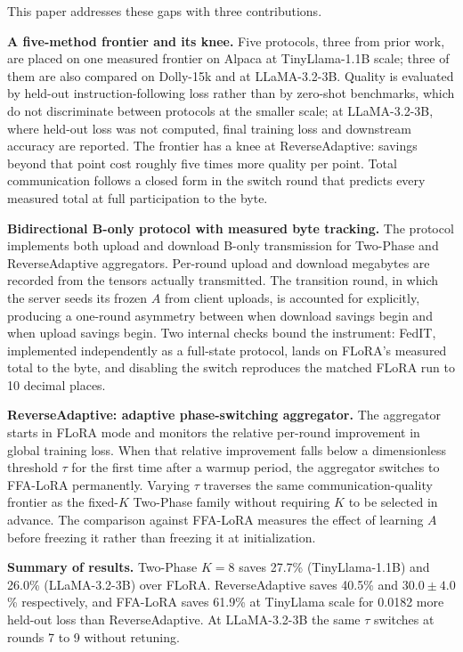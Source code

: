 \documentclass[pdflatex,sn-nature,lineno]{sn-jnl}
\begin{document}
This paper addresses these gaps with three contributions.

\textbf{A five-method frontier and its knee.}
Five protocols, three from prior work, are placed on one measured frontier on Alpaca at TinyLlama-1.1B scale; three of them are also compared on Dolly-15k and at LLaMA-3.2-3B. Quality is evaluated by held-out instruction-following loss rather than by zero-shot benchmarks, which do not discriminate between protocols at the smaller scale; at LLaMA-3.2-3B, where held-out loss was not computed, final training loss and downstream accuracy are reported. The frontier has a knee at ReverseAdaptive: savings beyond that point cost roughly five times more quality per point. Total communication follows a closed form in the switch round that predicts every measured total at full participation to the byte.

\textbf{Bidirectional B-only protocol with measured byte tracking.}
The protocol implements both upload and download B-only transmission for Two-Phase and ReverseAdaptive aggregators. Per-round upload and download megabytes are recorded from the tensors actually transmitted. The transition round, in which the server seeds its frozen $A$ from client uploads, is accounted for explicitly, producing a one-round asymmetry between when download savings begin and when upload savings begin. Two internal checks bound the instrument: FedIT, implemented independently as a full-state protocol, lands on FLoRA's measured total to the byte, and disabling the switch reproduces the matched FLoRA run to 10 decimal places.

\textbf{ReverseAdaptive: adaptive phase-switching aggregator.}
The aggregator starts in FLoRA mode and monitors the relative per-round improvement in global training loss. When that relative improvement falls below a dimensionless threshold $\tau$ for the first time after a warmup period, the aggregator switches to FFA-LoRA permanently. Varying $\tau$ traverses the same communication-quality frontier as the fixed-$K$ Two-Phase family without requiring $K$ to be selected in advance. The comparison against FFA-LoRA measures the effect of learning $A$ before freezing it rather than freezing it at initialization.

\textbf{Summary of results.}
Two-Phase $K{=}8$ saves 27.7\% (TinyLlama-1.1B) and 26.0\% (LLaMA-3.2-3B) over FLoRA. ReverseAdaptive saves 40.5\% and $30.0 \pm 4.0$\% respectively, and FFA-LoRA saves 61.9\% at TinyLlama scale for 0.0182 more held-out loss than ReverseAdaptive. At LLaMA-3.2-3B the same $\tau$ switches at rounds 7 to 9 without retuning.
\end{document}
